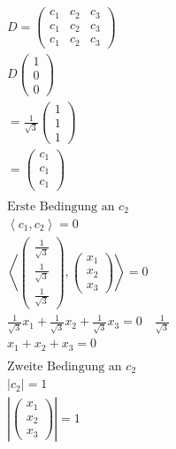 \begin{align*}
    D = \begin{pmatrix}
        c_1 & c_2 & c_3 \\
        c_1 & c_2 & c_3 \\
        c_1 & c_2 & c_3
    \end{pmatrix}\\
    D\begin{pmatrix}
        1 \\ 0 \\ 0
    \end{pmatrix} \\
    = \frac{1}{\sqrt{3}} \begin{pmatrix}
        1 \\ 1 \\ 1
    \end{pmatrix} \\
    = \begin{pmatrix}
        c_1 \\ c_1 \\ c_1
    \end{pmatrix} \\\\
    \text{Erste Bedingung an } c_2 \\
    \left\langle c_1, c_2 \right\rangle = 0 \\
    \left\langle \begin{pmatrix}
        \frac{1}{\sqrt{3}} \\
        \frac{1}{\sqrt{3}} \\
        \frac{1}{\sqrt{3}} 
    \end{pmatrix}, \begin{pmatrix}
        x_1 \\ x_2 \\ x_3
    \end{pmatrix} \right\rangle = 0 \\
    \frac{1}{\sqrt{3}}x_1 + \frac{1}{\sqrt{3}}x_2 + \frac{1}{\sqrt{3}}x_3 = 0 \quad \frac{1}{\sqrt{3}} \\
    x_1 + x_2 + x_3 = 0 \\\\
    \text{Zweite Bedingung an } c_2 \\
    \left|c_2\right| = 1 \\
    \left|\begin{pmatrix}
        x_1 \\x_2 \\ x_3
    \end{pmatrix}\right| = 1 \\

\end{align*}
